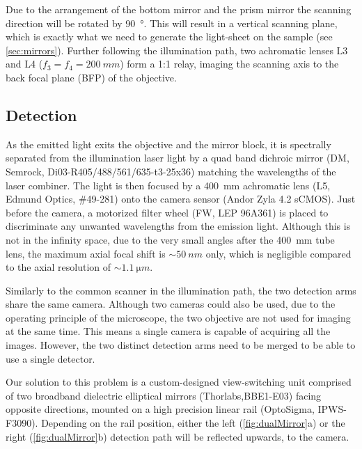     Due to the arrangement of the bottom mirror and the prism mirror the scanning direction will be rotated by \SI{90}{\degree}. This will result in a vertical scanning plane, which is exactly what we need to generate the light-sheet on the sample (see \autoref{sec:mirrors}).
    Further following the illumination path, two achromatic lenses L3 and L4 ($f_3 = f_4 = \SI{200}{mm}$) form a 1:1 relay, imaging the scanning axis to the back focal plane (BFP) of the objective.

   

  \subsection{Detection}
    As the emitted light exits the objective and the mirror block, it is spectrally separated from the illumination laser light by a quad band dichroic mirror (DM, Semrock, Di03-R405/488/561/635-t3-25x36) matching the wavelengths of the laser combiner. The light is then focused by a \SI{400}{mm} achromatic lens (L5, Edmund Optics, \#49-281) onto the camera sensor (Andor Zyla 4.2 sCMOS). Just before the camera, a motorized filter wheel (FW, LEP 96A361) is placed to discriminate any unwanted wavelengths from the emission light. Although this is not in the infinity space, due to the very small angles after the \SI{400}{mm} tube lens, the maximum axial focal shift is $\sim \SI{50}{nm}$ only, which is negligible compared to the axial resolution of $\sim \SI{1.1}{\micro m}$.

    Similarly to the common scanner in the illumination path, the two detection arms share the same camera. Although two cameras could also be used, due to the operating principle of the microscope, the two objective are not used for imaging at the same time. This means a single camera is capable of acquiring all the images. However, the two distinct detection arms need to be merged to be able to use a single detector.
    
    Our solution to this problem is a custom-designed view-switching unit comprised of two broadband dielectric elliptical mirrors (Thorlabs,BBE1-E03) facing opposite directions, mounted on a high precision linear rail (OptoSigma, IPWS-F3090). Depending on the rail position, either the left (\autoref{fig:dualMirror}a) or the right (\autoref{fig:dualMirror}b) detection path will be reflected upwards, to the camera. 


